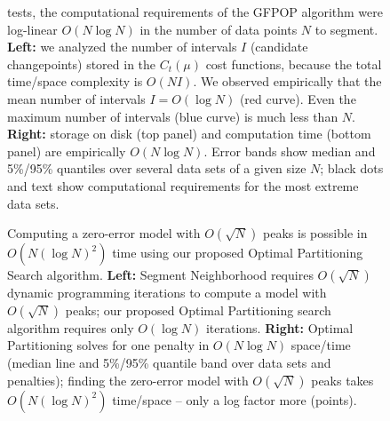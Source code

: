 \documentclass[article]{jss}
\begin{document}
\begin{figure}[t!]
{  tests, the computational requirements of the GFPOP algorithm
  were log-linear $O(N \log N)$ in the number of data points $N$ to
  segment. \textbf{Left:} we analyzed the number of intervals $I$
  (candidate changepoints) stored in the $C_t(\mu)$ cost functions,
  because the total time/space complexity is $O(NI)$. We observed
  empirically that the mean number of intervals $I=O(\log N)$ (red
  curve). Even the maximum number of intervals (blue curve) is much
  less than $N$. \textbf{Right:} storage on disk (top panel) and
  computation time (bottom panel) are empirically $O(N \log N)$. Error
  bands show median and 5\%/95\% quantiles over several data sets of a
  given size $N$; black dots and text show computational requirements
  for the most extreme data sets.}
\end{figure}

\begin{figure}[t!]
\centering
\begin{minipage}{3in}
  
\end{minipage} 
\begin{minipage}{3in} 
   
\end{minipage} 
\vskip -0.5cm
\caption{\label{fig:evaluations} Computing a zero-error model with
  $O(\sqrt{N})$ peaks is possible in $O(N(\log N)^2)$ time using our
  proposed Optimal Partitioning Search algorithm. \textbf{Left:}
  Segment Neighborhood requires $O(\sqrt{N})$ dynamic programming
  iterations to compute a model with $O(\sqrt{N})$ peaks; our proposed
  Optimal Partitioning search algorithm requires only $O(\log N)$
  iterations. \textbf{Right:} Optimal Partitioning solves for one
  penalty in $O(N\log N)$ space/time (median line and 5\%/95\% quantile band
  over data sets and penalties); finding the zero-error model with
  $O(\sqrt{N})$ peaks takes $O(N (\log N)^2)$ time/space -- only a log
  factor more (points).}
\end{figure} 
  
\end{document}
